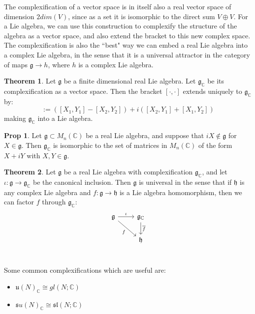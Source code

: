 \documentclass[11pt, oneside]{article}   	%
\theoremstyle{definition}
\newtheorem{theorem}{Theorem}[section]
\newtheorem{prop}{Prop}[section]
\begin{document}
The complexification of a vector space is in itself also a real vector space of dimension $2dim(V)$, since as a set it is isomorphic to 
the direct sum $V\oplus V$. For a Lie algebra, we can use this construction to complexify the structure of the algebra as a vector 
space, and also extend the bracket to this new complex space. The complexification is also the ``best" way we can embed a real 
Lie algebra into a complex Lie algebra, in the sense that it is a universal attractor in the category of maps $\mathfrak g\rightarrow 
h$, where $h$ is a complex Lie algebra. 

\begin{theorem}
	Let $\mathfrak g$ be a finite dimensional real Lie algebra. Let $\mathfrak g_\mathbb{C}$ be its complexification as a vector 
	space. Then the bracket $[\cdot, \cdot]$ extends uniquely to $\mathfrak g_\mathbb{C}$ by:
	\begin{equation}
		[X_1 + iX_2, Y_1 + iY_2] := ([X_1, Y_1] - [X_2, Y_2]) + i([X_2, Y_1] + [X_1, Y_2])
	\end{equation}
	making $\mathfrak g_\mathbb{C}$ into a Lie algebra. 
\end{theorem}

\begin{prop}
	Let $\mathfrak g\subset M_n(\mathbb C)$ be a real Lie algebra, and suppose that $iX\not\in\mathfrak g$ for $X\in
	\mathfrak g$. Then $\mathfrak g_\mathbb{C}$ is isomorphic to the set of matrices in $M_n(\mathbb C)$ of the form $X + iY$ 
	with $X, Y\in\mathfrak g$. 
\end{prop}

\begin{theorem}
	Let $\mathfrak g$ be a real Lie algebra with complexification $\mathfrak g_\mathbb{C}$, and let $\iota : \mathfrak g\rightarrow
	\mathfrak g_\mathbb{C}$ be the canonical inclusion. Then $\mathfrak g$ is universal in the sense that if $\mathfrak h$ is any 
	complex Lie algebra and $f : \mathfrak g\rightarrow\mathfrak h$ is a Lie algebra homomorphism, then we can factor $f$ 
	through $\mathfrak g_\mathbb{C}$:
	\[\begin{tikzcd}
		\mathfrak g\arrow[r, "\iota"]\arrow[dr, swap, "f"] & \mathfrak g_\mathbb{C}\arrow[d, "\overline{f}"] \\
		& \mathfrak h \\
	\end{tikzcd}\]
\end{theorem}
Some common complexifications which are useful are:
\begin{itemize}
	\item $\mathfrak u(N)_\mathbb{C}\cong gl(N; \mathbb C)$
	\item $\mathfrak su(N)_\mathbb{C}\cong \mathfrak{sl}(N; \mathbb C)$
\end{itemize}
\end{document}

